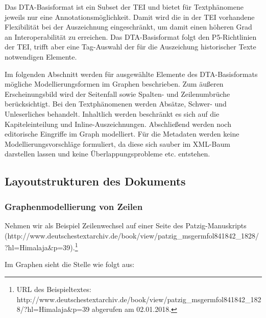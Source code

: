 Das DTA-Basisformat ist ein Subset der TEI und bietet für Textphänomene
jeweils nur eine Annotationsmöglichkeit. Damit wird die in der TEI
vorhandene Flexibilität bei der Auszeichnung eingeschränkt, um damit
einen höheren Grad an Interoperabilität zu erreichen. Das
DTA-Basisformat folgt den P5-Richtlinien der TEI, trifft aber eine
Tag-Auswahl der für die Auszeichung historischer Texte notwendigen
Elemente.

Im folgenden Abschnitt werden für ausgewählte Elemente des
DTA-Basisformats mögliche Modellierungsformen im Graphen beschrieben.
Zum äußeren Erscheinungsbild wird der Seitenfall sowie Spalten- und
Zeilenumbrüche berücksichtigt. Bei den Textphänomenen werden Absätze,
Schwer- und Unleserliches behandelt. Inhaltlich werden beschränkt es
sich auf die Kapiteleinteilung und Inline-Auszeichnungen. Abschließend
werden noch editorische Eingriffe im Graph modelliert. Für die Metadaten
werden keine Modellierungsvorschläge formuliert, da diese sich sauber im
XML-Baum darstellen lassen und keine Überlappungsprobleme etc.
entstehen.

\hypertarget{layoutstrukturen-des-dokuments}{%
\subsection{Layoutstrukturen des
Dokuments}\label{layoutstrukturen-des-dokuments}}

\hypertarget{graphenmodellierung-von-zeilen}{%
\subsubsection{Graphenmodellierung von
Zeilen}\label{graphenmodellierung-von-zeilen}}

Nehmen wir als Beispiel Zeilenwechsel auf einer Seite des
Patzig-Manuskripts
(http://www.deutschestextarchiv.de/book/view/patzig\_msgermfol841842\_1828/?hl=Himalaja\&p=39).\footnote{URL
  des Beispieltextes:
  http://www.deutschestextarchiv.de/book/view/patzig\_msgermfol841842\_1828/?hl=Himalaja\&p=39
  abgerufen am 02.01.2018.}

\begin{Shaded}
\begin{Highlighting}[]
\end{Highlighting}
\end{Shaded}

Im Graphen sieht die Stelle wie folgt aus:

